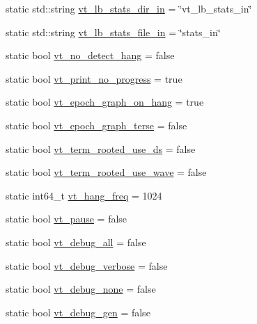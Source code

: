 \begin{DoxyCompactItemize}
\item 
static std\+::string \hyperlink{structvt_1_1arguments_1_1_arg_config_a2db08bf2d315dad981aaa9f5f79d31a5}{vt\+\_\+lb\+\_\+stats\+\_\+dir\+\_\+in} = \char`\"{}vt\+\_\+lb\+\_\+stats\+\_\+in\char`\"{}
\item 
static std\+::string \hyperlink{structvt_1_1arguments_1_1_arg_config_a7b294f12d448dcfe20f418db26a509bf}{vt\+\_\+lb\+\_\+stats\+\_\+file\+\_\+in} = \char`\"{}stats\+\_\+in\char`\"{}
\item 
static bool \hyperlink{structvt_1_1arguments_1_1_arg_config_a567d431e527d7a77c2bbddb4c52b781e}{vt\+\_\+no\+\_\+detect\+\_\+hang} = false
\item 
static bool \hyperlink{structvt_1_1arguments_1_1_arg_config_a6bbdd118f6e731cd446afb5e33af11bf}{vt\+\_\+print\+\_\+no\+\_\+progress} = true
\item 
static bool \hyperlink{structvt_1_1arguments_1_1_arg_config_ac691ea78d2c3079f3600f053f4fffa11}{vt\+\_\+epoch\+\_\+graph\+\_\+on\+\_\+hang} = true
\item 
static bool \hyperlink{structvt_1_1arguments_1_1_arg_config_a86447854a05bfbe2223a2e5a3561e78f}{vt\+\_\+epoch\+\_\+graph\+\_\+terse} = false
\item 
static bool \hyperlink{structvt_1_1arguments_1_1_arg_config_a7fad2709c0787c6ae775a83680ad9914}{vt\+\_\+term\+\_\+rooted\+\_\+use\+\_\+ds} = false
\item 
static bool \hyperlink{structvt_1_1arguments_1_1_arg_config_a1bd318b03ae9b5e87c2c7f2cde4a2a72}{vt\+\_\+term\+\_\+rooted\+\_\+use\+\_\+wave} = false
\item 
static int64\+\_\+t \hyperlink{structvt_1_1arguments_1_1_arg_config_a8bcbaf567f64aac567993c064179a5e5}{vt\+\_\+hang\+\_\+freq} = 1024
\item 
static bool \hyperlink{structvt_1_1arguments_1_1_arg_config_a46f31e594725bd599f66b0a0682162bc}{vt\+\_\+pause} = false
\item 
static bool \hyperlink{structvt_1_1arguments_1_1_arg_config_a2bad2770bdb9bfb9bb8f9cd6cd9ae492}{vt\+\_\+debug\+\_\+all} = false
\item 
static bool \hyperlink{structvt_1_1arguments_1_1_arg_config_ad863fc3da4d2e0e3ce0b36647da8e29b}{vt\+\_\+debug\+\_\+verbose} = false
\item 
static bool \hyperlink{structvt_1_1arguments_1_1_arg_config_ad8244f0e0ba0f2b2cbf2bc5f58acc5b0}{vt\+\_\+debug\+\_\+none} = false
\item 
static bool \hyperlink{structvt_1_1arguments_1_1_arg_config_a6c897d45359f0cae8d31f3817bbb9b60}{vt\+\_\+debug\+\_\+gen} = false

\end{DoxyCompactItemize}
